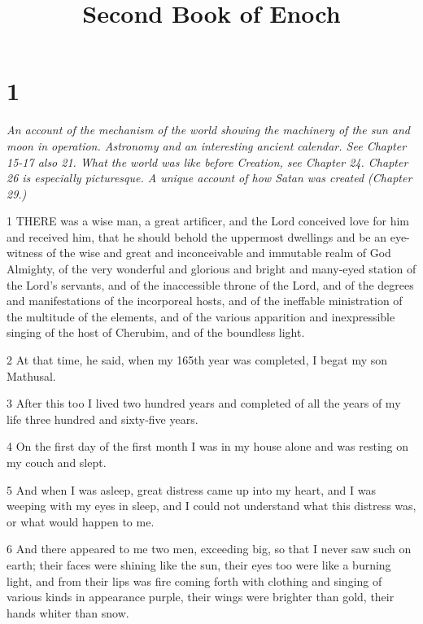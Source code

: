 

\title{Second Book of Enoch}

\chapter{1}

\par \textit{An account of the mechanism of the world showing the machinery of the sun and moon in operation. Astronomy and an interesting ancient calendar. See Chapter 15-17 also 21. What the world was like before Creation, see Chapter 24. Chapter 26 is especially picturesque. A unique account of how Satan was created (Chapter 29.)}

\par 1 THERE was a wise man, a great artificer, and the Lord conceived love for him and received him, that he should behold the uppermost dwellings and be an eye-witness of the wise and great and inconceivable and immutable realm of God Almighty, of the very wonderful and glorious and bright and many-eyed station of the Lord's servants, and of the inaccessible throne of the Lord, and of the degrees and manifestations of the incorporeal hosts, and of the ineffable ministration of the multitude of the elements, and of the various apparition and inexpressible singing of the host of Cherubim, and of the boundless light.

\par 2 At that time, he said, when my 165th year was completed, I begat my son Mathusal.

\par 3 After this too I lived two hundred years and completed of all the years of my life three hundred and sixty-five years.

\par 4 On the first day of the first month I was in my house alone and was resting on my couch and slept.

\par 5 And when I was asleep, great distress came up into my heart, and I was weeping with my eyes in sleep, and I could not understand what this distress was, or what would happen to me.

\par 6 And there appeared to me two men, exceeding big, so that I never saw such on earth; their faces were shining like the sun, their eyes too were like a burning light, and from their lips was fire coming forth with clothing and singing of various kinds in appearance purple, their wings were brighter than gold, their hands whiter than snow.

